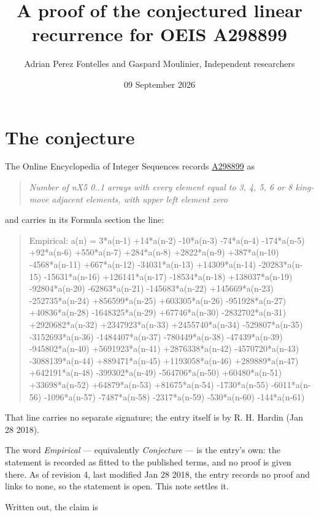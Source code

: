 \documentclass[11pt]{article}
\title{A proof of the conjectured linear recurrence for OEIS A298899}
\author{Adrian Perez Fontelles and Gaspard Moulinier, Independent researchers}
\date{09 September 2026}
\theoremstyle{definition}
\begin{document}
\maketitle
\section{The conjecture}

The Online Encyclopedia of Integer Sequences records \href{https://oeis.org/A298899}{A298899} as

\begin{quote}\itshape Number of nX5 0..1 arrays with every element equal to 3, 4, 5, 6 or 8 king-move adjacent elements, with upper left element zero\end{quote}

and carries in its Formula section the line:

\begin{quote}\ttfamily Empirical: a(n) = 3*a(n-1) +14*a(n-2) -10*a(n-3) -74*a(n-4) -174*a(n-5) +92*a(n-6) +550*a(n-7) +284*a(n-8) +2822*a(n-9) +387*a(n-10) -4568*a(n-11) +667*a(n-12) -34031*a(n-13) +14309*a(n-14) -20283*a(n-15) -15631*a(n-16) +126141*a(n-17) -18534*a(n-18) +138037*a(n-19) -92804*a(n-20) -62863*a(n-21) -145683*a(n-22) +145669*a(n-23) -252735*a(n-24) +856599*a(n-25) +603305*a(n-26) -951928*a(n-27) +40836*a(n-28) -1648325*a(n-29) +67746*a(n-30) -2832702*a(n-31) +2920682*a(n-32) +2347923*a(n-33) +2455740*a(n-34) -529807*a(n-35) -3152693*a(n-36) -1484407*a(n-37) -780449*a(n-38) -47439*a(n-39) -945802*a(n-40) +5691923*a(n-41) +2876338*a(n-42) -4570720*a(n-43) -3088139*a(n-44) +889471*a(n-45) +1193058*a(n-46) +289889*a(n-47) +642191*a(n-48) -399302*a(n-49) -564706*a(n-50) +60480*a(n-51) +33698*a(n-52) +64879*a(n-53) +81675*a(n-54) -1730*a(n-55) -6011*a(n-56) -1096*a(n-57) -7487*a(n-58) -2317*a(n-59) -530*a(n-60) -144*a(n-61)\end{quote}

That line carries no separate signature; the entry itself is by R. H. Hardin (Jan 28 2018).

The word {\itshape Empirical} --- equivalently {\itshape Conjecture} --- is the entry's own: the statement is recorded as fitted to the published terms, and no proof is given there. As of revision 4, last modified Jan 28 2018, the entry records no proof and links to none, so the statement is open. This note settles it.

Written out, the claim is
\end{document}
